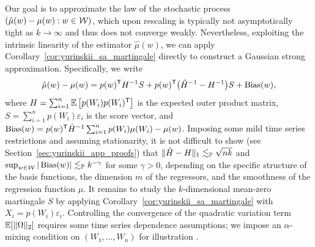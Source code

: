 Our goal is to approximate the law of the stochastic process
$(\hat\mu(w)-\mu(w):w\in\cW)$, which upon rescaling is typically not
asymptotically tight as $k \to \infty$ and thus does not converge weakly.
Nevertheless, exploiting the intrinsic linearity of the estimator $\hat\mu(w)$,
we can apply Corollary~\ref{cor:yurinskii_sa_martingale} directly to construct
a Gaussian
strong approximation. Specifically, we write
%
\begin{equation*}
  \hat\mu(w) - \mu(w)
  = p(w)^\T H^{-1} S
  + p(w)^\T \big(\hat H^{-1} - H^{-1}\big) S
  + \Bias(w),
\end{equation*}
%
where $H= \sum_{i=1}^n \E\left[p(W_i) p(W_i)^\T\right]$
is the expected outer product matrix, $S = \sum_{i=1}^n p(W_i) \varepsilon_i$
is the score vector, and
$\Bias(w) = p(w)^{\T} \hat H^{-1}\sum_{i=1}^n p(W_i) \mu(W_i) - \mu(w)$.
Imposing some mild time series restrictions and assuming stationarity,
it is not difficult to show
(see Section~\ref{sec:yurinskii_app_proofs})
that $\|\hat H - H\|_1 \lesssim_\P \sqrt{n k}$ and
$\sup_{w\in\cW} |\Bias(w)| \lesssim_\P k^{-\gamma}$
for some $\gamma>0$, depending on the specific structure of the basis
functions, the dimension $m$ of the regressors, and the smoothness of the
regression function $\mu$. It remains to study the $k$-dimensional
mean-zero martingale $S$ by applying
Corollary~\ref{cor:yurinskii_sa_martingale} with
$X_i=p(W_i) \varepsilon_i$. Controlling the convergence of the quadratic
variation term $\E[\|\Omega\|_2]$ requires some time series dependence
assumptions; we impose an $\alpha$-mixing condition on $(W_1, \ldots, W_n)$ for
illustration \citep{bradley2005basic}.

